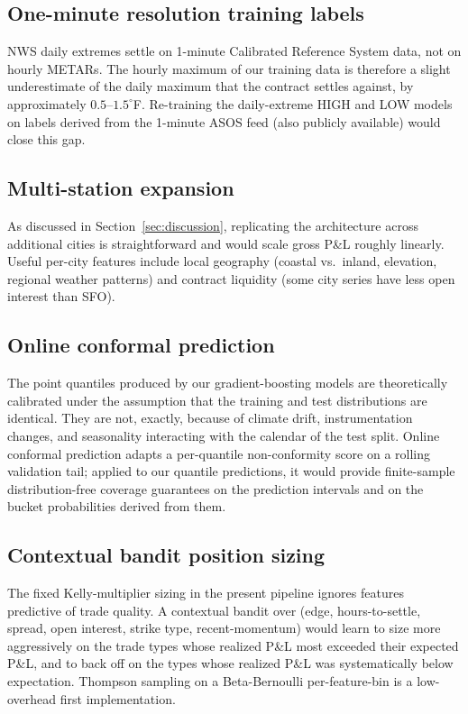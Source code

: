 \documentclass[11pt]{article}
\begin{document}
\subsection{One-minute resolution training labels}

NWS daily extremes settle on 1-minute Calibrated Reference System data,
not on hourly METARs. The hourly maximum of our training data is therefore
a slight underestimate of the daily maximum that the contract settles
against, by approximately $0.5$--$1.5^\circ$F. Re-training the daily-extreme
HIGH and LOW models on labels derived from the 1-minute ASOS feed
(also publicly available) would close this gap.

\subsection{Multi-station expansion}

As discussed in Section~\ref{sec:discussion}, replicating the architecture
across additional cities is straightforward and would scale gross P\&L
roughly linearly. Useful per-city features include local geography
(coastal vs.\ inland, elevation, regional weather patterns) and contract
liquidity (some city series have less open interest than SFO).

\subsection{Online conformal prediction}

The point quantiles produced by our gradient-boosting models are
theoretically calibrated under the assumption that the training and test
distributions are identical. They are not, exactly, because of climate
drift, instrumentation changes, and seasonality interacting with the
calendar of the test split. Online conformal prediction
\citep{angelopoulos2021gentle} adapts a per-quantile non-conformity score
on a rolling validation tail; applied to our quantile predictions, it
would provide finite-sample distribution-free coverage guarantees on the
prediction intervals and on the bucket probabilities derived from them.

\subsection{Contextual bandit position sizing}

The fixed Kelly-multiplier sizing in the present pipeline ignores
features predictive of trade quality. A contextual bandit over (edge,
hours-to-settle, spread, open interest, strike type, recent-momentum)
would learn to size more aggressively on the trade types whose realized
P\&L most exceeded their expected P\&L, and to back off on the types
whose realized P\&L was systematically below expectation. Thompson
sampling on a Beta-Bernoulli per-feature-bin is a low-overhead first
implementation.
\end{document}
